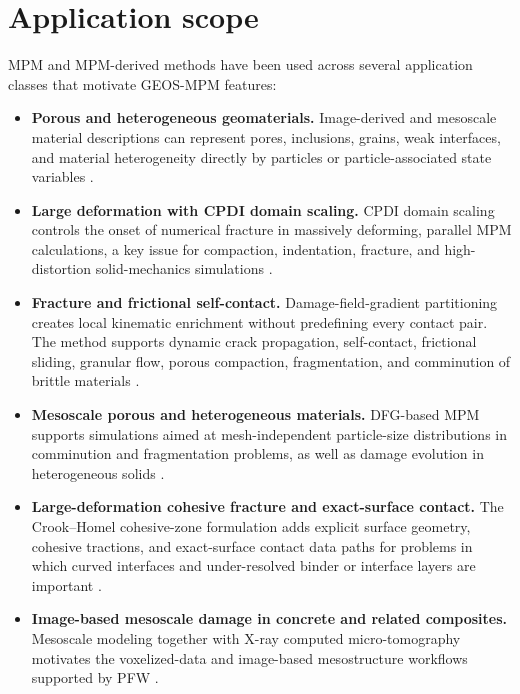 \section*{Application scope}
{}
MPM and MPM-derived methods have been used across several application classes that motivate GEOS-MPM features:
\begin{itemize}[leftmargin=*]
\item \textbf{Porous and heterogeneous geomaterials.}  Image-derived and mesoscale material descriptions can represent pores, inclusions, grains, weak interfaces, and material heterogeneity directly by particles or particle-associated state variables \cite{homel2017mesoscalevalidation,homel2017porous}.
\item \textbf{Large deformation with CPDI domain scaling.}  CPDI domain scaling controls the onset of numerical fracture in massively deforming, parallel MPM calculations, a key issue for compaction, indentation, fracture, and high-distortion solid-mechanics simulations \cite{homel2016domaindef}.
\item \textbf{Fracture and frictional self-contact.}  Damage-field-gradient partitioning creates local kinematic enrichment without predefining every contact pair.  The method supports dynamic crack propagation, self-contact, frictional sliding, granular flow, porous compaction, fragmentation, and comminution of brittle materials \cite{homel2016dfg}.
\item \textbf{Mesoscale porous and heterogeneous materials.}  DFG-based MPM supports simulations aimed at mesh-independent particle-size distributions in comminution and fragmentation problems, as well as damage evolution in heterogeneous solids \cite{homel2017porous}.
\item \textbf{Large-deformation cohesive fracture and exact-surface contact.}  The Crook--Homel cohesive-zone formulation adds explicit surface geometry, cohesive tractions, and exact-surface contact data paths for problems in which curved interfaces and under-resolved binder or interface layers are important \cite{crook2025cohesive}.
\item \textbf{Image-based mesoscale damage in concrete and related composites.}  Mesoscale modeling together with X-ray computed micro-tomography motivates the voxelized-data and image-based mesostructure workflows supported by PFW \cite{homel2022uhpc}.
\end{itemize}

